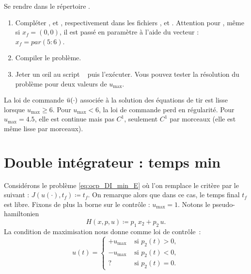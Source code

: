 \begin{myExercice} Se rendre dans le r\'epertoire .
    \begin{enumerate}
        \item Compl\'eter ,  et , respectivement dans les fichiers ,  et .
            Attention pour , m\^eme si $x_f = (0,0)$, il est pass\'e en param\`etre \`a l'aide du vecteur  : $x_f = par(5:6)$.
        \item Compiler le probl\`eme.
        \item Jeter un \oe il au script \matlab\  puis l'ex\'ecuter. Vous pouvez tester la r\'esolution du probl\`eme pour deux valeurs de
            $u_\mathrm{max}$.
    \end{enumerate}
\end{myExercice}

\begin{myremark}
    \anoter
    La loi de commande $\bar{u}(\cdot)$ associ\'ee \`a la solution des \'equations de tir est lisse lorsque $u_\mathrm{max} \ge 6$.
    Pour $u_\mathrm{max} < 6$, la loi de commande perd en r\'egularit\'e. Pour $u_\mathrm{max} = 4.5$, elle est continue mais pas $C^1$,
    seulement $C^1$ par morceaux (elle est m\^eme lisse par morceaux).
\end{myremark}

\section{Double int\'egrateur : temps min}

Consid\'erons le probl\`eme \eqref{eq:ocp_DI_min_E} o\`u l'on remplace le crit\`ere par le suivant : $J(u(\cdot), t_f) \coloneqq t_f$.
On remarque alors que dans ce cas, le temps final $t_f$ est libre. Fixons de plus la borne sur le contr\^ole : $u_\mathrm{max} = 1$.
%
Notons le pseudo-hamiltonien
\[
    H(x,p,u) \coloneqq p_1\, x_2 + p_2\, u.
\]
La condition de maximisation nous donne comme loi de contr\^ole~:
\begin{equation*}
    u(t) = 
    \left\{
        \begin{array}{ll}
            +u_\mathrm{max}  & \text{ si } p_2(t) > 0, \\[0.5em]
            -u_\mathrm{max}  & \text{ si } p_2(t) < 0, \\[0.5em]
            ?                & \text{ si } p_2(t) = 0.
        \end{array}
    \right.
\end{equation*}

